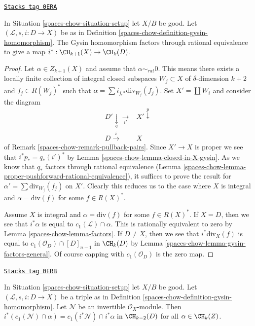\begin{lemma}
\label{spaces-chow-lemma-gysin-factors}
\href{https://stacks.math.columbia.edu/tag/0ERA}{\texttt{Stacks tag 0ERA}}

In Situation \ref{spaces-chow-situation-setup} let $X/B$ be good.
Let $(\mathcal{L}, s, i : D \to X)$ be as in
Definition \ref{spaces-chow-definition-gysin-homomorphism}.
The Gysin homomorphism factors through rational equivalence to
give a map $i^* : \CH_{k + 1}(X) \to \CH_k(D)$.
\end{lemma}

\begin{proof}
Let $\alpha \in Z_{k + 1}(X)$ and assume that $\alpha \sim_{rat} 0$.
This means there exists a locally finite collection of integral
closed subspaces $W_j \subset X$ of $\delta$-dimension $k + 2$
and $f_j \in R(W_j)^*$ such that
$\alpha = \sum i_{j, *}\text{div}_{W_j}(f_j)$.
Set $X' = \coprod W_i$ and consider the diagram
$$
\begin{array}{cc}D' \underset{q}{\downarrow}\underset{i'}{\longrightarrow} & X' \overset{p}{\downarrow} \\ D \overset{i}{\longrightarrow} & X\end{array}
$$
of Remark \ref{spaces-chow-remark-pullback-pairs}. Since $X' \to X$ is proper
we see that $i^*p_* = q_*(i')^*$ by Lemma \ref{spaces-chow-lemma-closed-in-X-gysin}.
As we know that $q_*$ factors through rational equivalence
(Lemma \ref{spaces-chow-lemma-proper-pushforward-rational-equivalence}), it suffices
to prove the result for $\alpha' = \sum \text{div}_{W_j}(f_j)$
on $X'$. Clearly this reduces us to the case where $X$ is integral
and $\alpha = \text{div}(f)$ for some $f \in R(X)^*$.

\medskip\noindent
Assume $X$ is integral and $\alpha = \text{div}(f)$ for some $f \in R(X)^*$.
If $X = D$, then we see that $i^*\alpha$ is equal
to $c_1(\mathcal{L}) \cap \alpha$.
This is rationally equivalent to zero by Lemma \ref{spaces-chow-lemma-factors}.
If $D \not = X$, then we see that $i^*\text{div}_X(f)$ is equal to
$c_1(\mathcal{O}_D) \cap [D]_{n - 1}$ in $\CH_k(D)$ by
Lemma \ref{spaces-chow-lemma-gysin-factors-general}. Of course
capping with $c_1(\mathcal{O}_D)$ is the zero map.
\end{proof}

\begin{lemma}
\label{spaces-chow-lemma-gysin-commutes-cap-c1}
\href{https://stacks.math.columbia.edu/tag/0ERB}{\texttt{Stacks tag 0ERB}}

In Situation \ref{spaces-chow-situation-setup} let $X/B$ be good.
Let $(\mathcal{L}, s, i : D \to X)$
be a triple as in Definition \ref{spaces-chow-definition-gysin-homomorphism}.
Let $\mathcal{N}$ be an invertible $\mathcal{O}_X$-module.
Then $i^*(c_1(\mathcal{N}) \cap \alpha) = c_1(i^*\mathcal{N}) \cap i^*\alpha$
in $\CH_{k - 2}(D)$ for all $\alpha \in \CH_k(Z)$.
\end{lemma}

